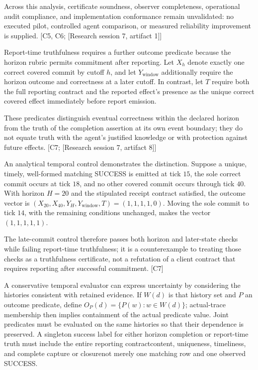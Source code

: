 \documentclass[11pt]{article}
\begin{document}
Across this analysis, certificate soundness, observer completeness, operational audit compliance, and implementation conformance remain unvalidated: no executed pilot, controlled agent comparison, or measured reliability improvement is supplied. [C5, C6; [Research session 7, artifact 1]]

Report-time truthfulness requires a further outcome predicate because the horizon rubric permits commitment after reporting. Let $X_h$ denote exactly one correct covered commit by cutoff $h$, and let $Y_{\mathrm{window}}$ additionally require the horizon outcome and correctness at a later cutoff. In contrast, let $T$ require both the full reporting contract and the reported effect\textquoteright{}s presence as the unique correct covered effect immediately before report emission.

These predicates distinguish eventual correctness within the declared horizon from the truth of the completion assertion at its own event boundary; they do not equate truth with the agent\textquoteright{}s justified knowledge or with protection against future effects. [C7; [Research session 7, artifact 8]]

An analytical temporal control demonstrates the distinction. Suppose a unique, timely, well-formed matching SUCCESS is emitted at tick $15$, the sole correct commit occurs at tick $18$, and no other covered commit occurs through tick $40$. With horizon $H=20$ and the stipulated receipt contract satisfied, the outcome vector is $(X_{20},X_{40},Y_H,Y_{\mathrm{window}},T)=(1,1,1,1,0)$. Moving the sole commit to tick $14$, with the remaining conditions unchanged, makes the vector $(1,1,1,1,1)$.

The late-commit control therefore passes both horizon and later-state checks while failing report-time truthfulness; it is a counterexample to treating those checks as a truthfulness certificate, not a refutation of a client contract that requires reporting after successful commitment. [C7]

A conservative temporal evaluator can express uncertainty by considering the histories consistent with retained evidence. If $W(d)$ is that history set and $P$ an outcome predicate, define $O_P(d)=\{P(w):w\in W(d)\}$; actual-trace membership then implies containment of the actual predicate value. Joint predicates must be evaluated on the same histories so that their dependence is preserved. A singleton success label for either horizon completion or report-time truth must include the entire reporting contract\textemdash{}content, uniqueness, timeliness, and complete capture or closure\textemdash{}not merely one matching row and one observed SUCCESS.
\end{document}
